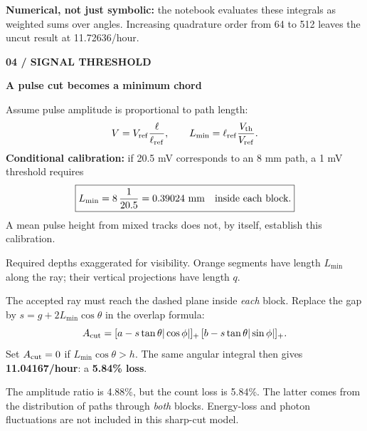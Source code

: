 \documentclass[11pt,a4paper]{article}
\newcommand{\pageheading}[2]{{\color{teal}\small\bfseries #1}\par
{\color{ink}\LARGE\bfseries #2}\par\vspace{5pt}}
\newcommand{\note}[1]{\par\noindent\colorbox{pale}{\parbox{\dimexpr\linewidth-2\fboxsep\relax}{\vspace{4pt}#1\vspace{4pt}}}\par}
\newcommand{\captiontext}[1]{{\small\color{muted}#1}\par}
\begin{document}
\note{\textbf{Numerical, not just symbolic:} the notebook evaluates these integrals
as weighted sums over angles. Increasing quadrature order from 64 to 512
leaves the uncut result at 11.72636/hour.}

\newpage
\pageheading{04 / SIGNAL THRESHOLD}{A pulse cut becomes a minimum chord}
Assume pulse amplitude is proportional to path length:
\[
V=V_{\rm ref}\frac{\ell}{\ell_{\rm ref}},
\qquad
L_{\min}=\ell_{\rm ref}\frac{V_{\rm th}}{V_{\rm ref}}.
\]
\textbf{Conditional calibration:} if 20.5 mV corresponds to an 8 mm path,
a 1 mV threshold requires
\[
\boxed{L_{\min}=8\,\frac{1}{20.5}=0.39024\ {\rm mm}
\quad\text{inside each block}.}
\]
A mean pulse height from mixed tracks does not, by itself, establish this calibration.

\begin{center}
\end{center}
\captiontext{Required depths exaggerated for visibility. Orange segments have length
$L_{\min}$ along the ray; their vertical projections have length $q$.}

The accepted ray must reach the dashed plane inside \emph{each} block.
Replace the gap by $s=g+2L_{\min}\cos\theta$ in the overlap formula:
\[
A_{\rm cut}
=[a-s\tan\theta|\cos\phi|]_+\,
 [b-s\tan\theta|\sin\phi|]_+.
\]
Set $A_{\rm cut}=0$ if $L_{\min}\cos\theta>h$.
The same angular integral then gives \textbf{11.04167/hour}: a \textbf{5.84\% loss}.

\note{The amplitude ratio is 4.88\%, but the count loss is 5.84\%.
The latter comes from the distribution of paths through \emph{both} blocks.
Energy-loss and photon fluctuations are not included in this sharp-cut model.}
\end{document}
